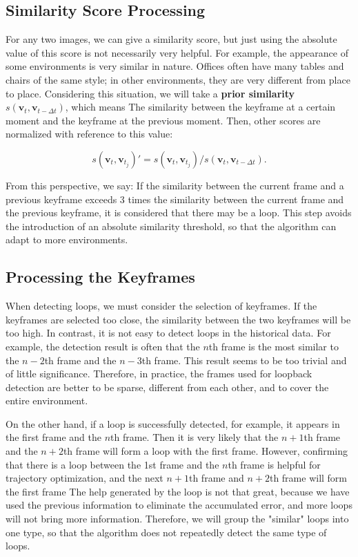 \subsection{Similarity Score Processing}
For any two images, we can give a similarity score, but just using the absolute value of this score is not necessarily very helpful. For example, the appearance of some environments is very similar in nature. Offices often have many tables and chairs of the same style; in other environments, they are very different from place to place. Considering this situation, we will take a \textbf{prior similarity} $s\left( \bm{v}_t, \bm{v}_{t-\Delta t}\right)$, which means The similarity between the keyframe at a certain moment and the keyframe at the previous moment. Then, other scores are normalized with reference to this value:

\begin{equation}
	s\left( \bm{v}_t, \bm{v}_{t_j}\right)' = s\left( \bm{v}_t, \bm{v}_{t_j}\right) / s\left( \bm{v}_t, \bm{v}_{t-\Delta t}\right).
\end{equation}

From this perspective, we say: If the similarity between the current frame and a previous keyframe exceeds 3 times the similarity between the current frame and the previous keyframe, it is considered that there may be a loop. This step avoids the introduction of an absolute similarity threshold, so that the algorithm can adapt to more environments.

\subsection{Processing the Keyframes}
When detecting loops, we must consider the selection of keyframes. If the keyframes are selected too close, the similarity between the two keyframes will be too high. In contrast, it is not easy to detect loops in the historical data. For example, the detection result is often that the $n$th frame is the most similar to the $n-2$th frame and the $n-3$th frame. This result seems to be too trivial and of little significance. Therefore, in practice, the frames used for loopback detection are better to be sparse, different from each other, and to cover the entire environment.

On the other hand, if a loop is successfully detected, for example, it appears in the first frame and the $n$th frame. Then it is very likely that the $n+1$th frame and the $n+2$th frame will form a loop with the first frame. However, confirming that there is a loop between the 1st frame and the $n$th frame is helpful for trajectory optimization, and the next $n+1$th frame and $n+2$th frame will form the first frame The help generated by the loop is not that great, because we have used the previous information to eliminate the accumulated error, and more loops will not bring more information. Therefore, we will group the "similar" loops into one type, so that the algorithm does not repeatedly detect the same type of loops.

